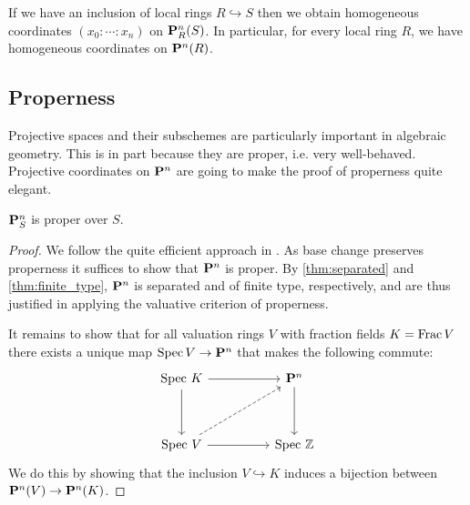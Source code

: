 \documentclass{article}
\begin{document}
If we have an inclusion of local rings $R\hookrightarrow S$
then we obtain homogeneous coordinates $(x_0:\cdots:x_n)$
on $\mathbf{P}^{n}_{R}(S)$. In particular, for every local ring $R$,
we have homogeneous coordinates on $\mathbf{P}^{n}_{}(R)$.

\subsection{Properness}

Projective spaces and their subschemes are particularly important
in algebraic geometry. This is in part because they are proper,
i.e. very well-behaved. Projective coordinates on $\mathbf{P}^{n}_{}$
are going to make the proof of properness quite elegant.

\begin{theorem}\label{thm:proper}
  $\mathbf{P}^{n}_{S}$ is proper over $S$.
  \begin{proof}
    We follow the quite efficient approach in \cite{davies2017}.
    As base change preserves properness it suffices to show
    that $\mathbf{P}^{n}_{}$ is proper. By \ref{thm:separated}
    and \ref{thm:finite_type}, $\mathbf{P}^{n}_{}$ is separated and of
    finite type, respectively,
    and are thus justified in applying the valuative criterion
    of properness.

    It remains to show that for all valuation rings
    $V$ with fraction fields $K=\operatorname{Frac} V$ there exists a unique
    map $\operatorname{Spec} V \to \mathbf{P}^{n}_{}$ that makes the following commute:
    \begin{equation}
      \begin{tikzcd}
        {\text{Spec }K} && {\mathbf P^n} \\
        \\
        {\text{Spec }V} && {\text{Spec }\mathbb Z}
        \arrow[from=1-1, to=3-1]
        \arrow[from=3-1, to=3-3]
        \arrow[from=1-3, to=3-3]
        \arrow[from=1-1, to=1-3]
        \arrow[dashed, from=3-1, to=1-3]
      \end{tikzcd}
    \end{equation}
    We do this by showing that the inclusion
    $V\hookrightarrow K$ induces a bijection between
    $\mathbf{P}^{n}_{}(V)\to\mathbf{P}^{n}_{}(K)$.


\end{proof}
\end{theorem}
\end{document}
